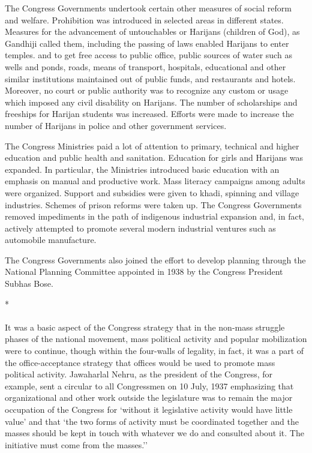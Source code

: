 The Congress Governments undertook certain other measures of social reform and welfare. Prohibition was introduced in selected areas in different states. Measures for the advancement of untouchables or Harijans (children of God), as Gandhiji called them, including the passing of laws enabled Harijans to enter temples. and to get free access to public office, public sources of water such as wells and ponds, roads, means of transport, hospitals, educational and other similar institutions maintained out of public funds, and restaurants and hotels. Moreover, no court or public authority was to recognize any custom or usage which imposed any civil disability on Harijans. The number of scholarships and freeships for Harijan students was increased. Efforts were made to increase the number of Harijans in police and other government services. 

The Congress Ministries paid a lot of attention to primary, technical and higher education and public health and sanitation. Education for girls and Harijans was expanded. In particular, the Ministries introduced basic education with an emphasis on manual and productive work. Mass literacy campaigns among adults were organized. Support and subsidies were given to khadi, spinning and village industries. Schemes of prison reforms were taken up. The Congress Governments removed impediments in the path of indigenous industrial expansion and, in fact, actively attempted to promote several modern industrial ventures such as automobile manufacture. 

The Congress Governments also joined the effort to develop planning through the National Planning Committee appointed in 1938 by the Congress President Subhas Bose.

\begin{center}*\end{center}

\paragraph*{}


It was a basic aspect of the Congress strategy that in the non-mass struggle phases of the national movement, mass political activity and popular mobilization were to continue, though within the four-walls of legality, in fact, it was a part of the office-acceptance strategy that offices would be used to promote mass political activity. Jawaharlal Nehru, as the president of the Congress, for example, sent a circular to all Congressmen on 10 July, 1937 emphasizing that organizational and other work outside the legislature was to remain the major occupation of the Congress for `without it legislative activity would have little value' and that `the two forms of activity must be coordinated together and the masses should be kept in touch with whatever we do and consulted about it. The initiative must come from the masses.'' 

